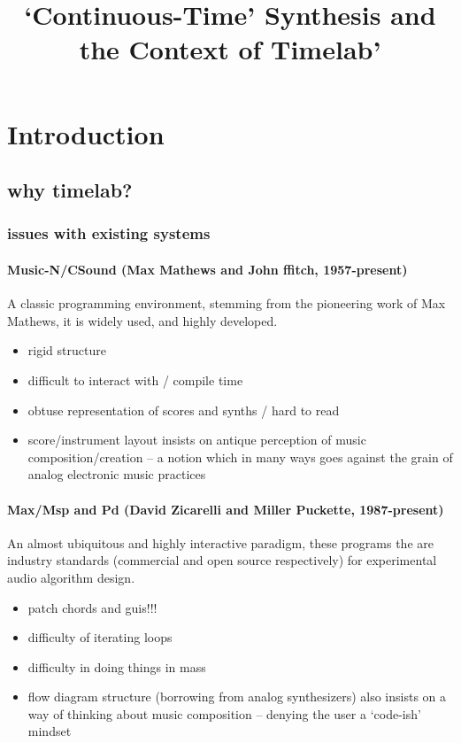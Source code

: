 \documentclass{article}
\begin{document}
\title{`Continuous-Time' Synthesis and the Context of Timelab'}
\maketitle
\section{Introduction}

\subsection{why timelab?}
\subsubsection{issues with existing systems}

\paragraph{Music-N/CSound (Max Mathews and John ffitch, 1957-present)}
A classic programming environment, stemming from the pioneering work of Max Mathews, it is  widely used, and highly developed.
\begin{itemize}
\item rigid structure 
\item difficult to interact with / compile time
\item obtuse representation of scores and synths / hard to read%
\item score/instrument layout insists on antique perception of music composition/creation -- a notion which in many ways goes against the grain of analog electronic music practices 
\end{itemize} 

\paragraph{Max/Msp and Pd (David Zicarelli and Miller Puckette, 1987-present)}
An almost ubiquitous and highly interactive paradigm, these programs the are industry standards (commercial and open source respectively) for experimental audio algorithm design.
\begin{itemize}
\item patch chords and guis!!!%
\item difficulty of iterating loops%
\item difficulty in doing things in mass
\item flow diagram structure (borrowing from analog synthesizers) also insists on a way of thinking about music composition -- denying the user a `code-ish' mindset
\end{itemize}
\end{document}
